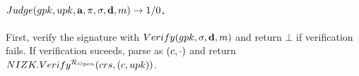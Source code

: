 \paragraph{$Judge(gpk,upk,\mathbf{a},\pi,\sigma,\mathbf{d},m)
  \rightarrow 1/0$.} %
First, verify the signature with $Verify(gpk,\sigma,\mathbf{d},m)$ and
return $\bot$ if verification fails. If verification suceeds, parse
\sig as $(c,\cdot)$ and return $NIZK.Verify^{\mathcal{R}_{Open}}(crs,(c,
upk))$.


